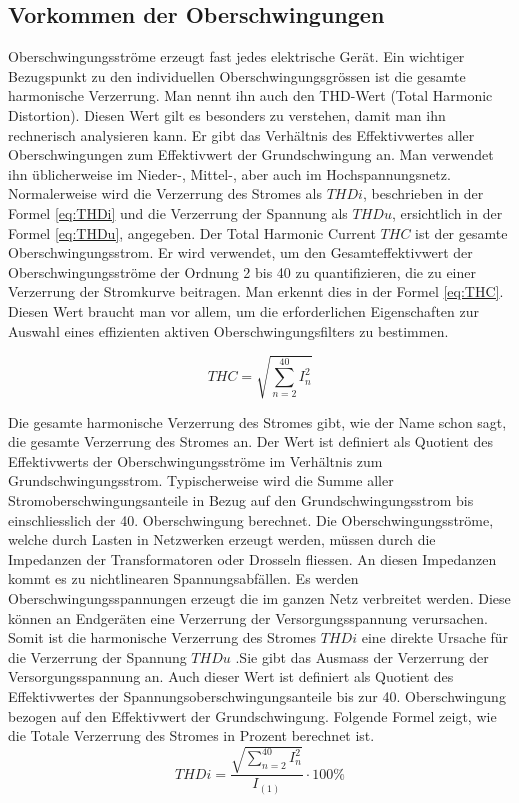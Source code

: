 \subsection{Vorkommen der Oberschwingungen}
Oberschwingungsströme erzeugt fast jedes elektrische Gerät. Ein wichtiger Bezugspunkt zu den individuellen Oberschwingungsgrössen ist die gesamte harmonische Verzerrung. Man nennt ihn auch den THD-Wert (Total Harmonic Distortion). Diesen Wert gilt es besonders zu verstehen, damit man ihn rechnerisch analysieren kann. Er gibt das Verhältnis des Effektivwertes aller Oberschwingungen zum Effektivwert der Grundschwingung an. Man verwendet ihn üblicherweise im Nieder-, Mittel-, aber auch im Hochspannungsnetz. Normalerweise wird die Verzerrung des Stromes als $THDi$, beschrieben in der Formel \ref{eq:THDi} und die Verzerrung der Spannung als $THDu$, ersichtlich in der Formel \ref{eq:THDu}, angegeben. Der Total Harmonic Current $THC$ ist der gesamte Oberschwingungsstrom. Er wird verwendet, um den Gesamteffektivwert der Oberschwingungsströme der Ordnung 2 bis 40 zu quantifizieren, die zu einer Verzerrung der Stromkurve beitragen. Man erkennt dies in der Formel \ref{eq:THC}. Diesen Wert braucht man vor allem, um die erforderlichen Eigenschaften zur Auswahl eines effizienten aktiven Oberschwingungsfilters zu bestimmen.

\begin{equation}\label{eq:THC}
THC = {\sqrt{\sum_{n=2}^{40} I_n^2}}
\end{equation}



Die gesamte harmonische Verzerrung des Stromes gibt, wie der Name schon sagt, die gesamte Verzerrung des Stromes an. Der Wert ist definiert als Quotient des Effektivwerts der Oberschwingungsströme im Verhältnis zum Grundschwingungsstrom. Typischerweise wird die Summe aller Stromoberschwingungsanteile in Bezug auf den Grundschwingungsstrom bis einschliesslich der 40. Oberschwingung berechnet. Die Oberschwingungsströme, welche durch Lasten in Netzwerken erzeugt werden, müssen durch die Impedanzen der Transformatoren oder Drosseln fliessen. An diesen Impedanzen kommt es zu nichtlinearen Spannungsabfällen. Es werden Oberschwingungsspannungen erzeugt die im ganzen Netz verbreitet werden. Diese können an Endgeräten eine Verzerrung der Versorgungsspannung verursachen. Somit ist die harmonische Verzerrung des Stromes $THDi$ eine direkte Ursache für die Verzerrung der Spannung $THDu$ .Sie gibt das Ausmass der Verzerrung der Versorgungsspannung an. Auch dieser Wert ist definiert als Quotient des Effektivwertes der Spannungsoberschwingungsanteile bis zur 40. Oberschwingung bezogen auf den Effektivwert der Grundschwingung. 
Folgende Formel zeigt, wie die Totale Verzerrung des Stromes in Prozent berechnet ist.
\begin{equation}\label{eq:THDi}
THDi = \frac{\sqrt{\sum_{n=2}^{40} I_n^2}}{I_{(1)}} \cdot 100 \%
\end{equation}

